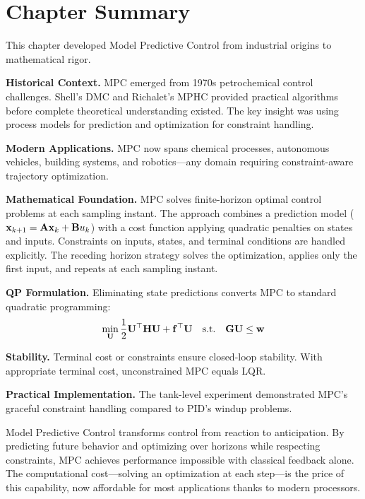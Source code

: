 \section{Chapter Summary}
\label{sec:summary}

This chapter developed Model Predictive Control from industrial origins to mathematical rigor.

\textbf{Historical Context.} MPC emerged from 1970s petrochemical control challenges. Shell's DMC and Richalet's MPHC provided practical algorithms before complete theoretical understanding existed. The key insight was using process models for prediction and optimization for constraint handling.

\textbf{Modern Applications.} MPC now spans chemical processes, autonomous vehicles, building systems, and robotics---any domain requiring constraint-aware trajectory optimization.

\textbf{Mathematical Foundation.} MPC solves finite-horizon optimal control problems at each sampling instant. The approach combines a prediction model ($\mathbf{x}_{k+1} = \mathbf{A}\mathbf{x}_k + \mathbf{B}u_k$) with a cost function applying quadratic penalties on states and inputs. Constraints on inputs, states, and terminal conditions are handled explicitly. The receding horizon strategy solves the optimization, applies only the first input, and repeats at each sampling instant.

\textbf{QP Formulation.} Eliminating state predictions converts MPC to standard quadratic programming:
\begin{equation*}
    \min_{\mathbf{U}} \frac{1}{2}\mathbf{U}^\top\mathbf{H}\mathbf{U} + \mathbf{f}^\top\mathbf{U} \quad \text{s.t.} \quad \mathbf{G}\mathbf{U} \leq \mathbf{w}
\end{equation*}

\textbf{Stability.} Terminal cost or constraints ensure closed-loop stability. With appropriate terminal cost, unconstrained MPC equals LQR.

\textbf{Practical Implementation.} The tank-level experiment demonstrated MPC's graceful constraint handling compared to PID's windup problems.

\begin{tcolorbox}[colback=yellow!10!white,colframe=orange!75!black,title=Key Takeaway,sharp corners]
Model Predictive Control transforms control from reaction to anticipation. By predicting future behavior and optimizing over horizons while respecting constraints, MPC achieves performance impossible with classical feedback alone. The computational cost---solving an optimization at each step---is the price of this capability, now affordable for most applications thanks to modern processors.
\end{tcolorbox}

